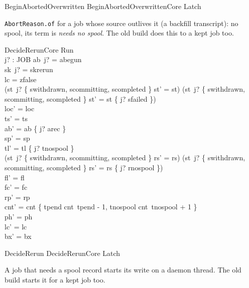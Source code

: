 \documentclass[a4paper,10pt,fleqn]{article}
\newcommand{\field}[1]{\texttt{#1}}
\begin{document}
\begin{zed}
BeginAbortedOverwritten  BeginAbortedOverwrittenCore \land Latch
\end{zed}

\field{AbortReason.of} for a job whose source outlives it (a backfill transcript):
no spool, its term is \emph{needs no spool}. The old build does this to a kept
job too.

\begin{schema}{DecideRerunCore}
\Delta Run \\ j? : JOB
\where
ab~j? = abegun \\
sk~j? = skrerun \\
lc = zfalse \\
(st~j? \in \{ swithdrawn, scommitting, scompleted \} \implies st' = st) \land (st~j? \notin \{ swithdrawn, scommitting, scompleted \} \implies st' = st \oplus \{ j? \mapsto sfailed \}) \\
loc' = loc \\
ts' = ts \\
ab' = ab \oplus \{ j? \mapsto arec \} \\
sp' = sp \\
tl' = tl \oplus \{ j? \mapsto tnospool \} \\
(st~j? \in \{ swithdrawn, scommitting, scompleted \} \implies rs' = rs) \land (st~j? \notin \{ swithdrawn, scommitting, scompleted \} \implies rs' = rs \oplus \{ j? \mapsto rnospool \}) \\
fl' = fl \\
fc' = fc \\
rp' = rp \\
cnt' = cnt \oplus \{ tpend \mapsto cnt~tpend - 1, tnospool \mapsto cnt~tnospool + 1 \} \\
ph' = ph \\
lc' = lc \\
bx' = bx
\end{schema}

\begin{zed}
DecideRerun  DecideRerunCore \land Latch
\end{zed}

A job that needs a spool record starts its write on a daemon thread. The old
build starts it for a kept job too.
\end{document}
